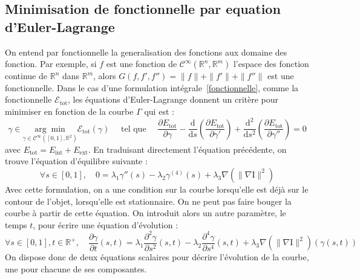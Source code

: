\documentclass[10pt,a4paper]{article}
\begin{document}
\subsection{Minimisation de fonctionnelle par equation d'Euler-Lagrange}
On entend par fonctionnelle la generalisation des fonctions aux domaine des fonction. Par exemple, si $f$ est une fonction de $\mathcal{C}^\infty(\mathbb{R}^n,\mathbb{R}^m)$ l'espace des fonction continue de $\mathbb{R}^n$ dans $\mathbb{R}^m$, alors $G(f,f',f'')=\|f\|+\|f'\|+\|f''\|$ est une fonctionnelle. Dans le cas d'une formulation int\'{e}grale~\eqref{fonctionnelle}, comme la fonctionnelle $\mathcal{E}_{\text{tot}}$, les \'{e}quations d'Euler-Lagrange donnent un crit\`{e}re pour minimiser en fonction de la courbe $\Gamma$ qui est :
\begin{displaymath}
	\gamma\in\underset{\gamma\in\mathcal{C}^{\infty}([0,1],\mathbb{R}^2)}{\arg\min} \mathcal{E}_{\text{tot}}(\gamma) \quad\text{    tel que     }\quad \frac{\partial E_{\text{tot}}}{\partial \gamma} -\frac{\mathrm{d}}{\mathrm{d}s}\left(\frac{\partial E_{\text{tot}}}{\partial \gamma'}\right) + \frac{\mathrm{d}^2}{\mathrm{d}s^2}\left(\frac{\partial E_{\text{tot}}}{\partial \gamma''}\right) = 0
\end{displaymath}
avec $E_{\text{tot}} = E_{\text{int}} + E_{\text{ext}}$. En traduisant directement l'\'{e}quation pr\'{e}c\'{e}dente, on trouve l'\'{e}quation d'\'{e}quilibre suivante :
\begin{displaymath}
	\forall s\in[0,1],\quad 0 = \lambda_1 \gamma''(s) - \lambda_2 \gamma^{(4)}(s) + \lambda_3 \nabla(\|\nabla \text{I}\|^2)
\end{displaymath}
Avec cette formulation, on a une condition sur la courbe lorsqu'elle est d\'{e}j\`{a} sur le contour de l'objet, lorsqu'elle est stationnaire. On ne peut pas faire bouger la courbe \`{a} partir de cette \'{e}quation. On introduit alors un autre param\`{e}tre, le temps $t$, pour \'{e}crire une \'{e}quation d'\'{e}volution : 
\begin{equation}\label{temporelContinu}
	\forall s\in[0,1], t\in\mathbb{R}^{+},\quad \frac{\partial \gamma}{\partial t}(s,t) = \lambda_1 \frac{\partial^2 \gamma}{\partial s^2}(s,t) - \lambda_2 \frac{\partial^4 \gamma}{\partial s^4}(s,t) + \lambda_3 \nabla(\|\nabla \text{I}\|^2)(\gamma(s,t))
\end{equation}
On dispose donc de deux \'{e}quations scalaires pour d\'{e}crire l'\'{e}volution de la courbe, une pour chacune de ses composantes.
\end{document}
